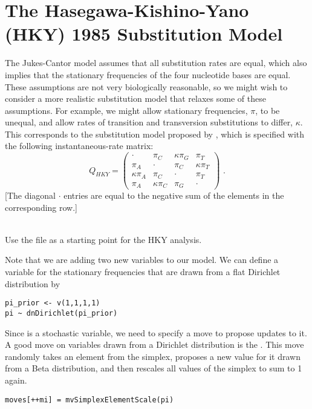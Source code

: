\newpage
\section{The Hasegawa-Kishino-Yano (HKY) 1985 Substitution Model}

The Jukes-Cantor model assumes that all substitution rates are equal, which also implies that the stationary frequencies of the four nucleotide bases are equal.
These assumptions are not very biologically reasonable, so we might wish to consider a more realistic substitution model that relaxes some of these assumptions.
For example, we might allow stationary frequencies, $\pi$, to be unequal, and allow rates of transition and transversion substitutions to differ, $\kappa$.
This corresponds to the substitution model proposed by \citet[][HKY]{Hasegawa1985}, which is specified with the following instantaneous-rate matrix: 
\begin{equation*}
Q_{HKY} = \begin{pmatrix} 
{\cdot} 			& {\pi_C} 	& {\kappa\pi_G} 			& {\pi_T} \\ 
{\pi_A} 		& {\cdot} 			& {\pi_C} 			& {\kappa\pi_T} \\ 
{\kappa\pi_A} 			& {\pi_C} 			& {\cdot} 			& {\pi_T} \\ 
{\pi_A} 			& {\kappa\pi_C} 			& {\pi_G} 	& {\cdot}  
\end{pmatrix} \mbox{  .}
\end{equation*}
[The diagonal ${\cdot}$ entries are equal to the negative sum of the elements in the corresponding row.] 

\noindent \\ \impmark Use the file  as a starting point for the HKY analysis.

Note that we are adding two new variables to our model.
We can define a variable  for the stationary frequencies that are drawn from a flat Dirichlet distribution by
{\tt \begin{snugshade*}
\begin{lstlisting}
pi_prior <- v(1,1,1,1) 
pi ~ dnDirichlet(pi_prior)
\end{lstlisting}
\end{snugshade*}}
Since  is a stochastic variable, we need to specify a move to propose updates to it.
A good move on variables drawn from a Dirichlet distribution is the .
This move randomly takes an element from the simplex, proposes a new value for it drawn from a Beta distribution, and then rescales all values of the simplex to sum to 1 again.
{\tt \begin{snugshade*}
\begin{lstlisting}
moves[++mi] = mvSimplexElementScale(pi)
\end{lstlisting}
\end{snugshade*}}

